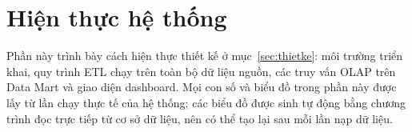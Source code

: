 \section{Hiện thực hệ thống}\label{sec:hienthuc}

Phần này trình bày cách hiện thực thiết kế ở mục~\ref{sec:thietke}: môi trường triển khai, quy trình ETL chạy trên toàn bộ dữ liệu nguồn, các truy vấn OLAP trên Data Mart và giao diện dashboard. Mọi con số và biểu đồ trong phần này được lấy từ lần chạy thực tế của hệ thống; các biểu đồ được sinh tự động bằng chương trình  đọc trực tiếp từ cơ sở dữ liệu, nên có thể tạo lại sau mỗi lần nạp dữ liệu.





